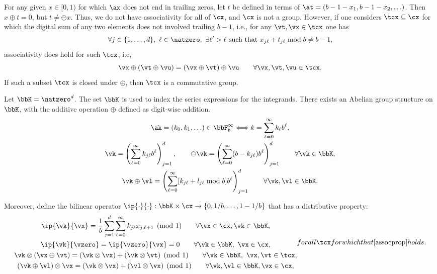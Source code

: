 \documentclass[]{elsarticle}
\theoremstyle{definition}
\begin{document}
For any given $x \in [0,1)$ for which $\ax$ does not end in trailing zeros, let $t$ be defined in terms of $\at=(b-1-x_1, b-1-x_2, \ldots)$.  Then $x \oplus t = 0$, but $t \ne \ominus x$.  Thus, we do not have associativity for all of $\cx$, and $\cx$ is not a group.  However, if one considers $\tcx \subseteq \cx$ for which the digital sum of any two elements does not involved trailing $b-1$, i.e., for any $\vt, \vx \in \tcx$ one has 
\[
\forall j \in \{1, \ldots, d\},\ \ell \in \natzero,\  \exists \ell'>\ell \text{ such that } x_{j\ell} + t_{j\ell} \bmod b \ne b-1,
\]
associativity does hold for such $\tcx$, i.e, 
\begin{equation} \label{assocprop}
\vx \oplus (\vt \oplus \vu) = (\vx \oplus \vt) \oplus \vu \qquad \forall \vx,\vt,\vu \in \tcx.
\end{equation}
If such a subset $\tcx$ is closed under $\oplus$, then $\tcx$ is a commutative group.

Let $\bbK=\natzero^d$.  The set $\bbK$ is used to index the series expressions for the integrands.  There exists an Abelian group structure on $\bbK$, with the additive operation $\oplus$ defined as digit-wise addition.  
\begin{gather*}
\ak=(k_0, k_1, \ldots ) \in \bbF_b^\infty \Longleftrightarrow k=\sum_{\ell=0}^\infty k_\ell b^{\ell},\\
\vk =  \left(\sum_{\ell=0}^{\infty} k_{j\ell} b^{\ell}\right)_{j=1}^d, \qquad \ominus \vk = \left(\sum_{\ell=0}^{\infty} (b-k_{j\ell}) b^{\ell}\right)_{j=1}^d \qquad \forall \vk \in \bbK, \\
\vk \oplus \vl = \left(\sum_{\ell=0}^{\infty} [k_{j\ell} + l_{j\ell} \bmod b] b^{\ell}\right)_{j=1}^d \qquad \forall \vk, \vl \in \bbK.
\end{gather*}

Moreover, define the bilinear operator $\ip{\cdot}{\cdot}: \bbK \times \cx \to \{0, 1/b, \ldots, 1-1/b\}$ that has a distributive property:
\begin{subequations} \label{distrib}
\begin{gather}
\ip{\vk}{\vx} = \frac 1b \sum_{j=1}^{d} \sum_{\ell=0}^{\infty} k_{j\ell}x_{j,\ell+1}  \pmod 1 \qquad \forall \vx \in \cx, \vk \in \bbK, \\
\ip{\vk}{\vzero} = \ip{\vzero}{\vx} = 0 \qquad \forall \vk \in \bbK, \ \vx \in \cx,\\
\vk \otimes (\vx \oplus \vt) = (\vk\otimes\vx) + (\vk\otimes\vt) \pmod 1 \qquad \forall \vk \in \bbK, \ \vx, \vt \in \tcx, \\
(\vk \oplus \vl) \otimes \vx = (\vk\otimes\vx) + (\vl\otimes\vx) \pmod 1 \qquad \forall \vk,\vl \in \bbK, \vx \in \cx,
\end{gather}
for all $\tcx$ for which that \eqref{assocprop} holds.
\end{subequations}
\end{document}
